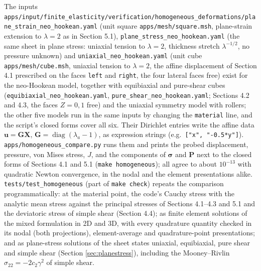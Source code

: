 \documentclass[11pt]{article}
\newcommand{\bX}{\bm{X}}
\newcommand{\bu}{\bm{u}}
\newcommand{\bsig}{\bm{\sigma}}
\newcommand{\bP}{\bm{P}}
\newcommand{\code}[1]{{\frenchspacing\texttt{#1}}}
\begin{document}
{\sloppy
The inputs \code{apps/input/finite\_elasticity/verification/homogeneous\_deformations/plane\_strain\_neo\_hookean.yaml} (unit
square \code{apps/mesh/square.msh}, plane-strain extension to $\lambda = 2$
as in Section 5.1),
\code{plane\_stress\_neo\_hookean.yaml} (the same sheet in plane stress: uniaxial
tension to $\lambda = 2$, thickness stretch $\lambda^{-1/2}$, no pressure
unknown) and \code{uniaxial\_neo\_hookean.yaml} (unit cube \code{apps/mesh/cube.msh},
uniaxial tension to $\lambda = 2$, the affine displacement of Section 4.1
prescribed on the faces \code{left} and \code{right}, the four lateral faces
free) exist for the neo-Hookean model, together with equibiaxial and
pure-shear cubes (\code{equibiaxial\_neo\_hookean.yaml},
\code{pure\_shear\_neo\_hookean.yaml}; Sections 4.2 and 4.3, the faces
$Z = 0, 1$ free) and the uniaxial symmetry model with rollers; the other five
models run in the same inputs by changing the \code{material} line, and the
script's closed forms cover all six.  Their Dirichlet entries write the affine data
$\bu = \bm{G}\bX$, $\bm{G} = \operatorname{diag}(\lambda_a - 1)$, as
expression strings (e.g.\ \code{["x", "-0.5*y"]}).
\code{apps/homogeneous\_compare.py} runs them and prints the probed
displacement, pressure, von Mises stress, $J$, and the components of
$\bsig$ and $\bP$ next to the closed forms of Sections 4.1 and 5.1
(\code{make homogeneous}); all agree to about $10^{-13}$ with quadratic
Newton convergence, in the nodal and the element presentations alike.  \code{tests/test\_homogeneous}
(part of \code{make check}) repeats the comparison programmatically: at the
material point, the code's Cauchy stress with the analytic mean stress
against the principal stresses of Sections 4.1--4.3 and 5.1 and the
deviatoric stress of simple shear (Section 4.4); as finite element
solutions of the mixed formulation in 2D and 3D, with every quadrature
quantity checked in its nodal (both projections), element-average and
quadrature-point presentations; and as plane-stress
solutions of the sheet states uniaxial, equibiaxial, pure shear and simple
shear (Section \ref{sec:planestress}), including the Mooney--Rivlin
$\sigma_{22} = -2c_2\gamma^2$ of simple shear.\par}
\end{document}
